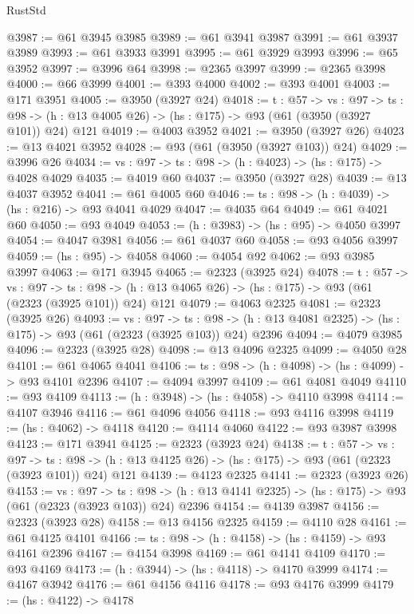 \begin{lexlean}{RustStd}
\begin{coremodule}
@3987 := @61 @3945 @3985
@3989 := @61 @3941 @3987
@3991 := @61 @3937 @3989
@3993 := @61 @3933 @3991
@3995 := @61 @3929 @3993
@3996 := @65 @3952
@3997 := @3996 @64
@3998 := @2365 @3997
@3999 := @2365 @3998
@4000 := @66 @3999
@4001 := @393 @4000
@4002 := @393 @4001
@4003 := @171 @3951
@4005 := @3950 (@3927 @24)
@4018 := {t : @57} ->
  {vs : @97} ->
  {ts : @98} -> (h : @13 @4005 @26) -> (hs : @175) -> @93 (@61 (@3950 (@3927 @101)) @24) @121
@4019 := @4003 @3952
@4021 := @3950 (@3927 @26)
@4023 := @13 @4021 @3952
@4028 := @93 (@61 (@3950 (@3927 @103)) @24)
@4029 := @3996 @26
@4034 := {vs : @97} -> {ts : @98} -> (h : @4023) -> (hs : @175) -> @4028 @4029
@4035 := @4019 @60
@4037 := @3950 (@3927 @28)
@4039 := @13 @4037 @3952
@4041 := @61 @4005 @60
@4046 := {ts : @98} -> (h : @4039) -> (hs : @216) -> @93 @4041 @4029
@4047 := @4035 @64
@4049 := @61 @4021 @60
@4050 := @93 @4049
@4053 := (h : @3983) -> (hs : @95) -> @4050 @3997
@4054 := @4047 @3981
@4056 := @61 @4037 @60
@4058 := @93 @4056 @3997
@4059 := (hs : @95) -> @4058
@4060 := @4054 @92
@4062 := @93 @3985 @3997
@4063 := @171 @3945
@4065 := @2323 (@3925 @24)
@4078 := {t : @57} ->
  {vs : @97} ->
  {ts : @98} -> (h : @13 @4065 @26) -> (hs : @175) -> @93 (@61 (@2323 (@3925 @101)) @24) @121
@4079 := @4063 @2325
@4081 := @2323 (@3925 @26)
@4093 := {vs : @97} ->
  {ts : @98} -> (h : @13 @4081 @2325) -> (hs : @175) -> @93 (@61 (@2323 (@3925 @103)) @24) @2396
@4094 := @4079 @3985
@4096 := @2323 (@3925 @28)
@4098 := @13 @4096 @2325
@4099 := @4050 @28
@4101 := @61 @4065 @4041
@4106 := {ts : @98} -> (h : @4098) -> (hs : @4099) -> @93 @4101 @2396
@4107 := @4094 @3997
@4109 := @61 @4081 @4049
@4110 := @93 @4109
@4113 := (h : @3948) -> (hs : @4058) -> @4110 @3998
@4114 := @4107 @3946
@4116 := @61 @4096 @4056
@4118 := @93 @4116 @3998
@4119 := (hs : @4062) -> @4118
@4120 := @4114 @4060
@4122 := @93 @3987 @3998
@4123 := @171 @3941
@4125 := @2323 (@3923 @24)
@4138 := {t : @57} ->
  {vs : @97} ->
  {ts : @98} -> (h : @13 @4125 @26) -> (hs : @175) -> @93 (@61 (@2323 (@3923 @101)) @24) @121
@4139 := @4123 @2325
@4141 := @2323 (@3923 @26)
@4153 := {vs : @97} ->
  {ts : @98} -> (h : @13 @4141 @2325) -> (hs : @175) -> @93 (@61 (@2323 (@3923 @103)) @24) @2396
@4154 := @4139 @3987
@4156 := @2323 (@3923 @28)
@4158 := @13 @4156 @2325
@4159 := @4110 @28
@4161 := @61 @4125 @4101
@4166 := {ts : @98} -> (h : @4158) -> (hs : @4159) -> @93 @4161 @2396
@4167 := @4154 @3998
@4169 := @61 @4141 @4109
@4170 := @93 @4169
@4173 := (h : @3944) -> (hs : @4118) -> @4170 @3999
@4174 := @4167 @3942
@4176 := @61 @4156 @4116
@4178 := @93 @4176 @3999
@4179 := (hs : @4122) -> @4178

\end{coremodule}
\end{lexlean}
